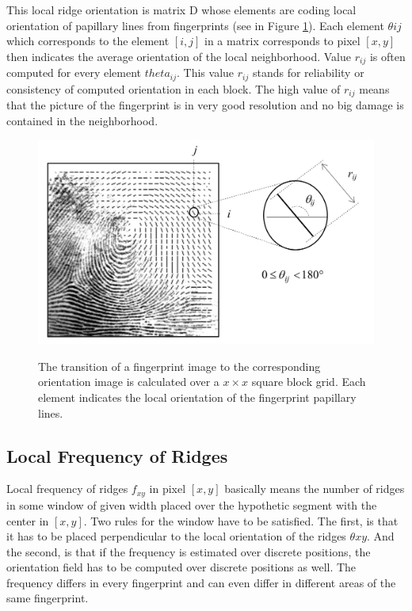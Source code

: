 This local ridge orientation is matrix D whose elements are coding local orientation of papillary lines from fingerprints (see in Figure \ref{fig:ori}). Each element $\theta{ij}$  which corresponds to the element $[i,j]$ in a matrix corresponds to pixel $[x, y]$ then indicates the average orientation of the local neighborhood. Value $r_{ij}$ is often computed for every element $theta_{ij}$. This value $r_{ij}$ stands for reliability or consistency of computed orientation in each block. The high value of $r_{ij}$ means that the picture of the fingerprint is in very good resolution and no big damage is contained in the neighborhood. \cite{maltoni2009handbook}

\begin{figure}[H]
    \centering
        {\includegraphics[width=0.6\linewidth]{obrazky-figures/ori.png}}\\
        \caption{The transition of a fingerprint image to the corresponding orientation image is calculated over a $x \times x$ square block grid. Each element indicates the local orientation of the fingerprint papillary lines. \cite{maltoni2009handbook}}
        \label{fig:ori}
\end{figure}

\subsection{Local Frequency of Ridges}
Local frequency of ridges $f_{xy}$ in pixel $[x,y]$ basically means the number of ridges in some window of given width placed over the hypothetic segment with the center in $[x,y]$. Two rules for the window have to be satisfied. The first, is that it has to be placed perpendicular to the local orientation of the ridges $\theta{xy}$. And the second, is that if the frequency is estimated over discrete positions, the orientation field has to be computed over discrete positions as well. The frequency differs in every fingerprint and can even differ in different areas of the same fingerprint. \cite{maltoni2009handbook}

